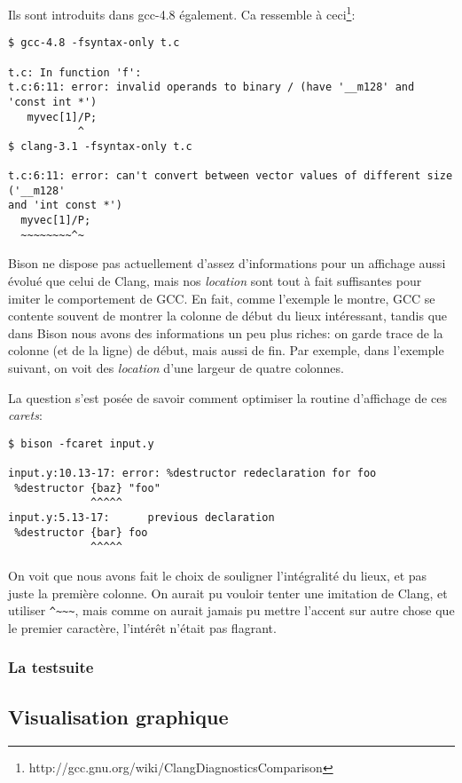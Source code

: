 \documentclass[a4paper,11pt,twoside,final]{article}
\begin{document}
  Ils sont introduits dans gcc-4.8 également. Ca ressemble à ceci\footnote{%
  http://gcc.gnu.org/wiki/ClangDiagnosticsComparison}:

  \begin{verbatim}
$ gcc-4.8 -fsyntax-only t.c

t.c: In function 'f':
t.c:6:11: error: invalid operands to binary / (have '__m128' and 'const int *')
   myvec[1]/P;
           ^
$ clang-3.1 -fsyntax-only t.c

t.c:6:11: error: can't convert between vector values of different size ('__m128'
and 'int const *')
  myvec[1]/P;
  ~~~~~~~~^~
  \end{verbatim}

  Bison ne dispose pas actuellement d'assez d'informations pour un affichage
  aussi évolué que celui de Clang, mais nos \textit{location} sont tout à fait
  suffisantes pour imiter le comportement de GCC\@. En fait, comme l'exemple le
  montre, GCC se contente souvent de montrer la colonne de début du lieux
  intéressant, tandis que dans Bison nous avons des informations un peu plus
  riches: on garde trace de la colonne (et de la ligne) de début, mais aussi de
  fin. Par exemple, dans l'exemple suivant, on voit des \textit{location} d'une
  largeur de quatre colonnes.

  La question s'est posée de savoir comment optimiser la routine d'affichage de
  ces \textit{carets}:
  \begin{verbatim}
$ bison -fcaret input.y

input.y:10.13-17: error: %destructor redeclaration for foo
 %destructor {baz} "foo"
             ^^^^^
input.y:5.13-17:      previous declaration
 %destructor {bar} foo
             ^^^^^
\end{verbatim}

  On voit que nous avons fait le choix de souligner l'intégralité du lieux, et
  pas juste la première colonne. On aurait pu vouloir tenter une imitation de
  Clang, et utiliser \verb|^~~~|, mais comme on aurait jamais pu
  mettre l'accent sur autre chose que le premier caractère, l'intérêt n'était
  pas flagrant.


  \subsubsection{La testsuite}

  \subsection{Visualisation graphique}
\end{document}
